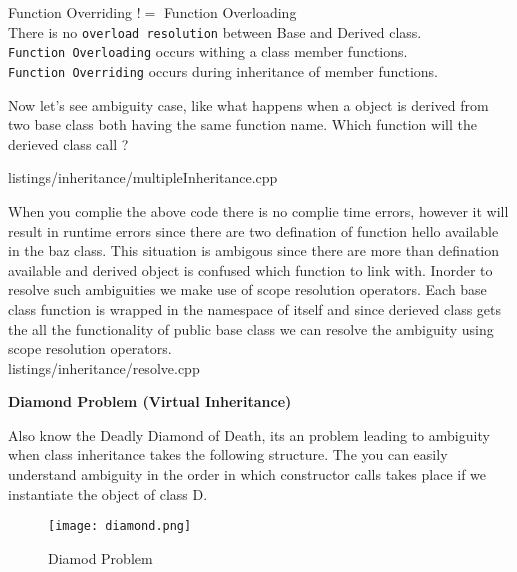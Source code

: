 \documentclass[oops.tex]{subfiles}
\begin{document}
\begin{center}
    Function Overriding $!=$ Function Overloading\\
    There is no \texttt{overload resolution} between Base and Derived class.\\
    \texttt{Function Overloading} occurs withing a class member functions.\\
    \texttt{Function Overriding} occurs during inheritance of member functions.\\
\end{center}

Now let's see ambiguity case, like what happens when a object is derived from 
two base class both having the same function name. Which function will the 
derieved class call ?


{listings/inheritance/multipleInheritance.cpp}

When you complie the above code there is no complie time errors, however it
will result in runtime errors since there are two defination of function hello
available in the baz class. This situation is ambigous since there are more
than defination available and derived object is confused which function to 
link with. Inorder to resolve such ambiguities we make use of scope resolution
operators. Each base class function is wrapped in the namespace of itself and
since derieved class gets the all the functionality of public base class we 
can resolve the ambiguity using scope resolution operators.\\


{listings/inheritance/resolve.cpp}

\newpage{}

{\bf Diamond Problem (Virtual Inheritance)}

Also know the Deadly Diamond of Death, its an problem leading to ambiguity when
class inheritance takes the following structure. The you can easily understand
ambiguity in the order in which constructor calls takes place if we instantiate
the object of class D.

\begin{figure}[h]
    \begin{center}
        \caption{Diamod Problem}
        \texttt{[image: diamond.png]}
    \end{center}
\end{figure}
\end{document}
